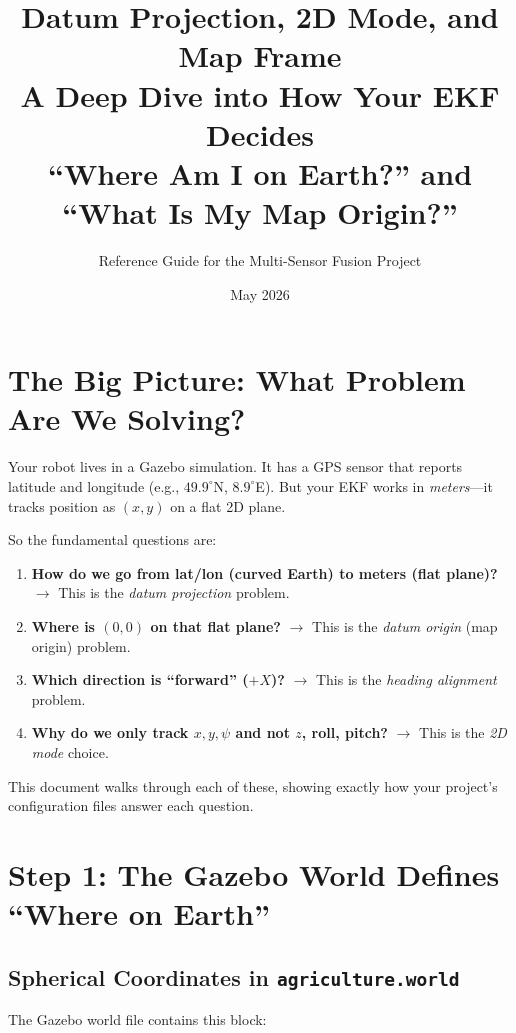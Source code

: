 \documentclass[11pt,a4paper]{article}
\title{\LARGE\bfseries Datum Projection, 2D Mode, and Map Frame\\[6pt]
\large A Deep Dive into How Your EKF Decides\\
``Where Am I on Earth?'' and ``What Is My Map Origin?''}
\author{Reference Guide for the Multi-Sensor Fusion Project}
\date{May 2026}
\begin{document}
\maketitle
\tableofcontents
\newpage

\section{The Big Picture: What Problem Are We Solving?}

Your robot lives in a Gazebo simulation. It has a GPS sensor that reports
latitude and longitude (e.g., $49.9^\circ$N, $8.9^\circ$E). But your EKF
works in \emph{meters}---it tracks position as $(x, y)$ on a flat 2D plane.

So the fundamental questions are:
\begin{enumerate}
  \item \textbf{How do we go from lat/lon (curved Earth) to meters (flat plane)?}
        $\rightarrow$ This is the \emph{datum projection} problem.
  \item \textbf{Where is $(0, 0)$ on that flat plane?}
        $\rightarrow$ This is the \emph{datum origin} (map origin) problem.
  \item \textbf{Which direction is ``forward'' ($+X$)?}
        $\rightarrow$ This is the \emph{heading alignment} problem.
  \item \textbf{Why do we only track $x, y, \psi$ and not $z$, roll, pitch?}
        $\rightarrow$ This is the \emph{2D mode} choice.
\end{enumerate}

This document walks through each of these, showing exactly how your project's
configuration files answer each question.

\section{Step 1: The Gazebo World Defines ``Where on Earth''}

\subsection{Spherical Coordinates in \texttt{agriculture.world}}

The Gazebo world file contains this block:
\end{document}
